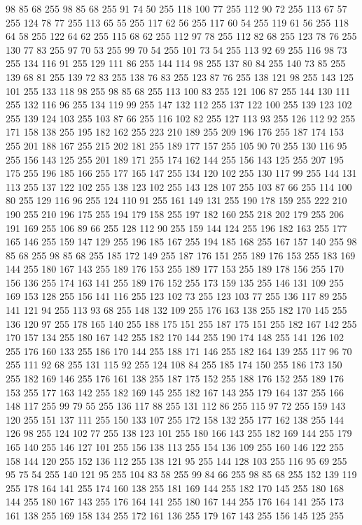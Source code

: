 98 85 68 255 98 85 68 255 91 74 50 255 118 100 77 255 112 90 72 255 113 67 57 255 124 78 77 255 113 65 55 255 117 62 56 255 117 60 54 255 119 61 56 255 118 64 58 255 122 64 62 255 115 68 62 255 112 97 78 255 112 82 68 255 123 78 76 255 130 77 83 255 97 70 53 255 99 70 54 255 101 73 54 255 113 92 69 255 116 98 73 255 134 116 91 255 129 111 86 255 144 114 98 255 137 80 84 255 140 73 85 255 139 68 81 255 139 72 83 255 138 76 83 255 123 87 76 255 138 121 98 255 143 125 101 255 133 118 98 255 98 85 68 255 113 100 83 255 121 106 87 255 144 130 111 255 132 116 96 255 134 119 99 255 147 132 112 255 137 122 100 255 139 123 102 255 139 124 103 255 103 87 66 255 116 102 82 255 127 113 93 255 126 112 92 255 171 158 138 255 195 182 162 255 223 210 189 255 209 196 176 255 187 174 153 255 201 188 167 255 215 202 181 255 189 177 157 255 105 90 70 255 130 116 95 255 156 143 125 255 201 189 171 255 174 162 144 255 156 143 125 255 207 195 175 255
196 185 166 255 177 165 147 255 134 120 102 255 130 117 99 255 144 131 113 255 137 122 102 255 138 123 102 255 143 128 107 255 103 87 66 255 114 100 80 255 129 116 96 255 124 110 91 255 161 149 131 255 190 178 159 255 222 210 190 255 210 196 175 255 194 179 158 255 197 182 160 255 218 202 179 255 206 191 169 255 106 89 66 255 128 112 90 255 159 144 124 255 196 182 163 255 177 165 146 255 159 147 129 255 196 185 167 255 194 185 168 255 167 157 140 255 98 85 68 255 98 85 68 255 185 172 149 255 187 176 151 255 189 176 153 255 183 169 144 255 180 167 143 255 189 176 153 255 189 177 153 255 189 178 156 255 170 156 136 255 174 163 141 255 189 176 152 255 173 159 135 255 146 131 109 255 169 153 128 255 156 141 116 255 123 102 73 255 123 103 77 255 136 117 89 255 141 121 94 255 113 93 68 255 148 132 109 255 176 163 138 255 182 170 145 255 136 120 97 255 178 165 140 255 188 175 151 255 187 175 151 255 182 167 142 255 170 157 134 255 180 167 142 255 182 170 144 255 190 174 148 255 141 126 102 255
176 160 133 255 186 170 144 255 188 171 146 255 182 164 139 255 117 96 70 255 111 92 68 255 131 115 92 255 124 108 84 255 185 174 150 255 186 173 150 255 182 169 146 255 176 161 138 255 187 175 152 255 188 176 152 255 189 176 153 255 177 163 142 255 182 169 145 255 182 167 143 255 179 164 137 255 166 148 117 255 99 79 55 255 136 117 88 255 131 112 86 255 115 97 72 255 159 143 120 255 151 137 111 255 150 133 107 255 172 158 132 255 177 162 138 255 144 126 98 255 124 102 77 255 138 123 101 255 180 166 143 255 182 169 144 255 179 165 140 255 146 127 101 255 156 138 113 255 154 136 109 255 160 146 122 255 158 144 120 255 152 136 112 255 138 121 95 255 144 128 103 255 116 95 69 255 95 75 54 255 140 121 95 255 104 83 58 255 99 84 66 255 98 85 68 255 152 139 119 255 178 164 141 255 174 160 138 255 181 169 144 255 182 170 145 255 180 168 144 255 180 167 143 255 176 164 141 255 180 167 144 255 176 164 141 255 173 161 138 255 169 158 134 255 172 161 136 255 179 167 143 255 156 145 125 255
